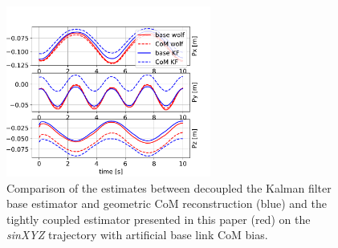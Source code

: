 \begin{figure}[t]
    \centering
    \includegraphics[width=0.6\textwidth]{figures/centroidal/base_com_position_wolf_vs_KF.pdf}
    \caption{Comparison of the estimates between decoupled the Kalman filter base estimator and geometric CoM reconstruction (blue) and 
    the tightly coupled estimator presented in this paper (red) on the \textit{sinXYZ} trajectory with artificial base link CoM bias.}
    \label{fig:comparison_KF_wolf}
\end{figure}


